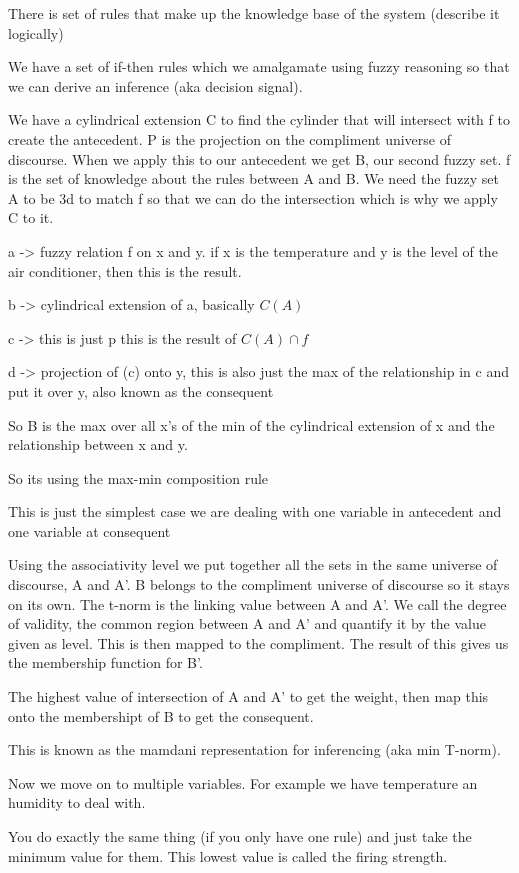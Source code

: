 \documentclass{article}
\begin{document}


There is set of rules that make up the knowledge base of the system (describe it logically)

We have a set of if-then rules which we amalgamate using fuzzy reasoning so that we can derive an inference (aka decision signal).


We have a cylindrical extension C  to find the cylinder that will intersect with f to create the antecedent. P is the projection on the compliment universe of discourse. When we apply this to our antecedent we get B, our second fuzzy set. f is the set of knowledge about the rules between A and B. We need the fuzzy set A to be 3d to match f so that we can do the intersection which is why we apply C to it.


a -> fuzzy relation f on x and y.  if x is the temperature and y is the level of the air conditioner, then this is the result.

b -> cylindrical extension of a, basically $C(A)$

c -> this is just p  this is the result of $C(A)\cap f$

d -> projection of (c) onto y, this is also just the max of the relationship in c and put it over y, also known as the consequent


So B is the max over all x's of the min of the cylindrical extension of x and the relationship between x and y.

So its using the max-min composition rule

This is just the simplest case we are dealing with one variable in antecedent and one variable at consequent






Using the associativity level we put together all the sets in the same universe of discourse, A and A'. B belongs to the compliment universe of discourse so it stays on its own. The t-norm is the linking value between A and A'. We call the degree of validity, the common region between A and A' and quantify it by the value given as level. This is then mapped to the compliment. The result of this gives us the membership function for B'.

The highest value of intersection of A and A' to get the weight, then map this onto the membershipt of B to get the consequent.

This is known as the mamdani representation for inferencing (aka min T-norm).


Now we move on to multiple variables. For example we have temperature an humidity to deal with.

You do exactly the same thing (if you only have one rule) and just take the minimum value for them. This lowest value is called the firing strength.




\end{document}
